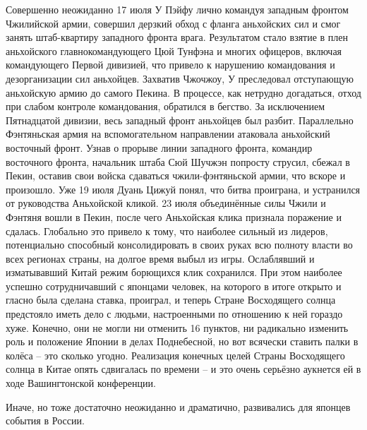 Совершенно неожиданно 17 июля У Пэйфу лично командуя западным фронтом Чжилийской армии, совершил дерзкий обход с фланга аньхойских сил и смог занять штаб-квартиру западного фронта врага. Результатом стало взятие в плен аньхойского главнокомандующего Цюй Тунфэна и многих офицеров, включая командующего Первой дивизией, что привело к нарушению командования и дезорганизации сил аньхойцев. Захватив Чжочжоу, У преследовал отступающую аньхойскую армию до самого Пекина. В процессе, как нетрудно догадаться, отход при слабом контроле командования, обратился в бегство. За исключением Пятнадцатой дивизии, весь западный фронт аньхойцев был разбит. Параллельно Фэнтяньская армия на вспомогательном направлении атаковала аньхойский восточный фронт. Узнав о прорыве линии западного фронта, командир восточного фронта, начальник штаба Сюй Шучжэн попросту струсил, сбежал в Пекин, оставив свои войска сдаваться чжили-фэнтяньской армии, что вскоре и произошло. Уже 19 июля Дуань Цижуй понял, что битва проиграна, и устранился от руководства Аньхойской кликой. 23 июля объединённые силы Чжили и Фэнтяня вошли в Пекин, после чего Аньхойская клика признала поражение и сдалась. Глобально это привело к тому, что наиболее сильный из лидеров, потенциально способный консолидировать в своих руках всю полноту власти во всех регионах страны, на долгое время выбыл из игры. Ослаблявший и изматывавший Китай режим борющихся клик сохранился. При этом наиболее успешно сотрудничавший с японцами человек, на которого в итоге открыто и гласно была сделана ставка, проиграл, и теперь Стране Восходящего солнца предстояло иметь дело с людьми, настроенными по отношению к ней гораздо хуже. Конечно, они не могли ни отменить 16 пунктов, ни радикально изменить роль и положение Японии в делах Поднебесной, но вот всячески ставить палки в колёса – это сколько угодно. Реализация конечных целей Страны Восходящего солнца в Китае опять сдвигалась по времени – и это очень серьёзно аукнется ей в ходе Вашингтонской конференции.

Иначе, но тоже достаточно неожиданно и драматично, развивались для японцев события в России.

